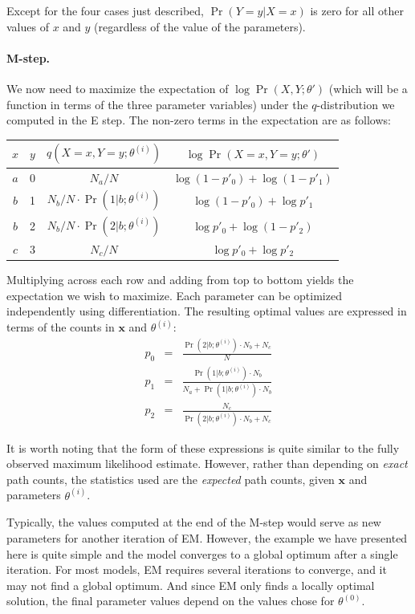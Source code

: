 \noindent Except for the four cases just described, $\Pr(Y=y|X=x)$ is
zero for all other values of $x$ and $y$ (regardless of the value of
the parameters).

\paragraph{\textbf{M-step.}}
We now need to maximize the expectation of $\log \Pr(X,Y;\theta')$
(which will be a function in terms of the three parameter variables)
under the $q$-distribution we computed in the E step.  The non-zero
terms in the expectation are as follows:
\begin{center}
\begin{tabular}{c|c|c|c}
$x$ & $y$ & $q(X=x,Y=y;\theta^{(i)})$ & $\log \Pr(X=x,Y=y;\theta')$ \\
\hline
$a$ & 0 & $N_a/N$ & $\log (1-p'_0) + \log (1 - p'_1)$ \\
$b$ & 1 & $N_b/N \cdot \Pr(1|b;\theta^{(i)}) $ & $\log(1 - p'_0) + \log p'_1$ \\
$b$ & 2 & $N_b/N \cdot \Pr(2|b;\theta^{(i)}) $ & $\log p'_0 + \log (1-p'_2)$ \\
$c$ & 3 & $N_c/N$ & $\log p'_0 + \log p'_2$ \\
\end{tabular}
\end{center}

\noindent Multiplying across each row and adding from top to bottom
yields the expectation we wish to maximize.  Each parameter can be
optimized independently using differentiation.  The resulting optimal
values are expressed in terms of the counts in $\textbf{x}$ and
$\theta^{(i)}$:
\begin{eqnarray}
p_0 &=& \frac{\Pr(2|b;\theta^{(i)}) \cdot N_b + N_c}{N} \\
p_1 &=& \frac{\Pr(1|b;\theta^{(i)}) \cdot N_b}{N_a + \Pr(1|b;\theta^{(i)}) \cdot N_b} \\
p_2 &=& \frac{N_c}{\Pr(2|b;\theta^{(i)}) \cdot N_b + N_c}
\end{eqnarray}

\noindent It is worth noting that the form of these expressions is
quite similar to the fully observed maximum likelihood estimate.
However, rather than depending on \emph{exact} path counts, the
statistics used are the \emph{expected} path counts, given
$\textbf{x}$ and parameters $\theta^{(i)}$.

Typically, the values computed at the end of the M-step would serve as
new parameters for another iteration of EM.  However, the example we
have presented here is quite simple and the model converges to a
global optimum after a single iteration.  For most models, EM requires
several iterations to converge, and it may not find a global optimum.
And since EM only finds a locally optimal solution, the final
parameter values depend on the values chose for $\theta^{(0)}$.

